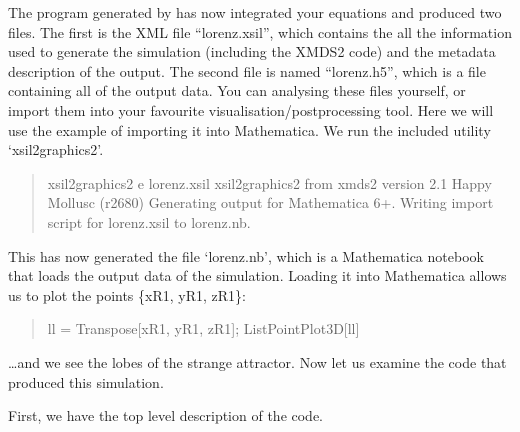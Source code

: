 \documentclass[letterpaper,10pt,english]{sphinxmanual}
\begin{document}
\ignorespaces 
\sphinxAtStartPar
The program generated by  has now integrated your equations and produced two files.  The first is the XML file “lorenz.xsil”, which contains the all the information used to generate the simulation (including the XMDS2 code) and the metadata description of the output.  The second file is named “lorenz.h5”, which is a  file containing all of the output data.   You can analysing these files yourself, or import them into your favourite visualisation/postprocessing tool.  Here we will use the example of importing it into Mathematica.  We run the included utility ‘xsil2graphics2’.
\begin{quote}

\begin{sphinxVerbatim}[commandchars=\\\{\}]
\PYGZdl{} xsil2graphics2 \PYGZhy{}e lorenz.xsil
xsil2graphics2 from xmds2 version 2.1 \PYGZdq{}Happy Mollusc\PYGZdq{} (r2680)
Generating output for Mathematica 6+.
Writing import script for \PYGZsq{}lorenz.xsil\PYGZsq{} to \PYGZsq{}lorenz.nb\PYGZsq{}.
\end{sphinxVerbatim}
\end{quote}

\sphinxAtStartPar
This has now generated the file ‘lorenz.nb’, which is a Mathematica notebook that loads the output data of the simulation.  Loading it into Mathematica allows us to plot the points \{xR1, yR1, zR1\}:
\begin{quote}

\begin{sphinxVerbatim}[commandchars=\\\{\}]
ll = Transpose[\PYGZob{}xR1, yR1, zR1\PYGZcb{}];
ListPointPlot3D[ll]
\end{sphinxVerbatim}
\end{quote}


\sphinxAtStartPar
…and we see the lobes of the strange attractor.  Now let us examine the code that produced this simulation.

\sphinxAtStartPar
First, we have the top level description of the code.
\end{document}
